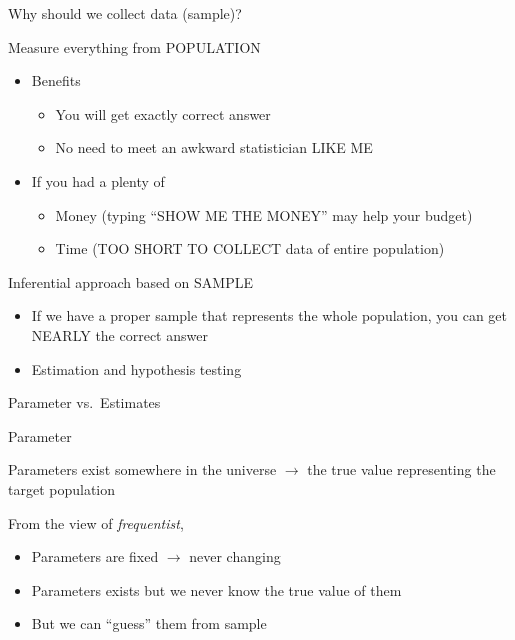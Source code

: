 \documentclass[9pt,ignorenonframetext,xcolor=dvipsnames]{beamer}
\providecommand{\tightlist}{%
  \setlength{\itemsep}{0pt}\setlength{\parskip}{0pt}}
\newlength{\wideitemsep}
\let\olditem\item
\renewcommand{\item}{\setlength{\itemsep}{\wideitemsep}\olditem}
\begin{document}
\begin{frame}{Why should we collect data (sample)?}

\begin{block}{Measure everything from POPULATION}

\begin{itemize}
\tightlist
\item
  Benefits

  \begin{itemize}
  \tightlist
  \item
    You will get exactly correct answer
  \item
    No need to meet an awkward statistician LIKE ME
  \end{itemize}
\item
  If you had a plenty of

  \begin{itemize}
  \tightlist
  \item
    Money (typing ``SHOW ME THE MONEY'' may help your budget)
  \item
    Time (TOO SHORT TO COLLECT data of entire population)
  \end{itemize}
\end{itemize}

\end{block}

\begin{block}{Inferential approach based on SAMPLE}

\begin{itemize}
\tightlist
\item
  If we have a proper sample that represents the whole population, you
  can get NEARLY the correct answer
\item
  Estimation and hypothesis testing
\end{itemize}

\end{block}

\end{frame}

\begin{frame}{Parameter vs.~Estimates}

\begin{block}{Parameter}

Parameters exist somewhere in the universe \(\rightarrow\) the true
value representing the target population

From the view of \textit{frequentist},

\begin{itemize}
\tightlist
\item
  Parameters are fixed \(\rightarrow\) never changing
\item
  Parameters exists but we never know the true value of them
\item
  But we can ``guess'' them from sample
\end{itemize}

\end{block}

\end{frame}
\end{document}
